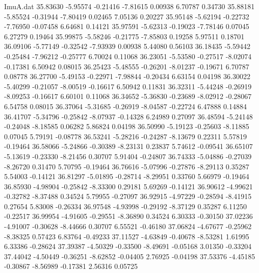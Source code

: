\begin{filecontents}{ImuA.dat}
  35.83630   -5.95574   -0.21416   -7.81615    0.00938    6.70787    0.34730
  35.88181   -5.85524   -0.31944   -7.80419    0.02465    7.05136    0.20227
  35.95148   -5.62194   -0.22732   -7.76950   -0.07458    6.64681    0.14121
  35.97591   -5.62313   -0.19023   -7.78146    0.07045    6.27279    0.19464
  35.99875   -5.58246   -0.21775   -7.85803    0.19258    5.97511    0.18701
  36.09106   -5.77149   -0.32542   -7.93939    0.00938    5.44080    0.56103
  36.18435   -5.59442   -0.25484   -7.96212   -0.25777    6.70024    0.11068
  36.23051   -5.53580   -0.27517   -8.02074   -0.17381    6.50942    0.08015
  36.25423   -5.48555   -0.26201   -8.01237   -0.19671    6.70787    0.08778
  36.27700   -5.49153   -0.22971   -7.98844   -0.20434    6.63154    0.04198
  36.30022   -5.40299   -0.21057   -8.00519   -0.16617    6.50942    0.11831
  36.32311   -5.44248   -0.26919   -8.09253   -0.16617    6.60101    0.11068
  36.34652   -5.36830   -0.23689   -8.02912   -0.28067    6.54758    0.08015
  36.37064   -5.31685   -0.26919   -8.04587   -0.22724    6.47888    0.14884
  36.41707   -5.34796   -0.25842   -8.07937   -0.14328    6.24989    0.27097
  36.48594   -5.24148   -0.24048   -8.18585    0.06282    5.86824    0.04198
  36.50990   -5.19123   -0.25603   -8.11885    0.07045    5.79191   -0.08778
  36.53241   -5.28216   -0.24287   -8.13679    0.22311    5.57819   -0.19464
  36.58066   -5.24866   -0.30389   -8.23131    0.23837    5.74612   -0.09541
  36.65107   -5.13619   -0.23330   -8.21456    0.30707    5.91404   -0.24807
  36.74333   -5.04886   -0.27039   -8.26720    0.31470    5.70795   -0.19464
  36.76616   -5.07996   -0.27876   -8.29113    0.35287    5.54003   -0.14121
  36.81297   -5.01895   -0.28714   -8.29951    0.33760    5.66979   -0.19464
  36.85930   -4.98904   -0.25842   -8.33300    0.29181    5.69269   -0.14121
  36.90612   -4.99621   -0.32782   -8.37488    0.34524    5.79955   -0.27097
  36.92915   -4.97229   -0.28594   -8.41915    0.27654    5.83008   -0.26334
  36.97548   -4.93998   -0.29192   -8.37129    0.35287    6.11250   -0.22517
  36.99954   -4.91605   -0.29551   -8.36890    0.34524    6.30333   -0.30150
  37.02236   -4.91007   -0.30628   -8.44666    0.30707    6.55521   -0.46180
  37.06824   -4.67677   -0.25962   -8.38325    0.57423    6.83764   -0.49233
  37.11527   -4.63849   -0.40678   -8.53281    1.61995    6.33386   -0.28624
  37.39387   -4.50329   -0.33500   -8.49691   -0.05168    3.01350   -0.33204
  37.44042   -4.50449   -0.36251   -8.62852   -0.04405    2.76925   -0.04198
  37.53376   -4.45185   -0.30867   -8.56989   -0.17381    2.56316    0.05725

\end{filecontents}
